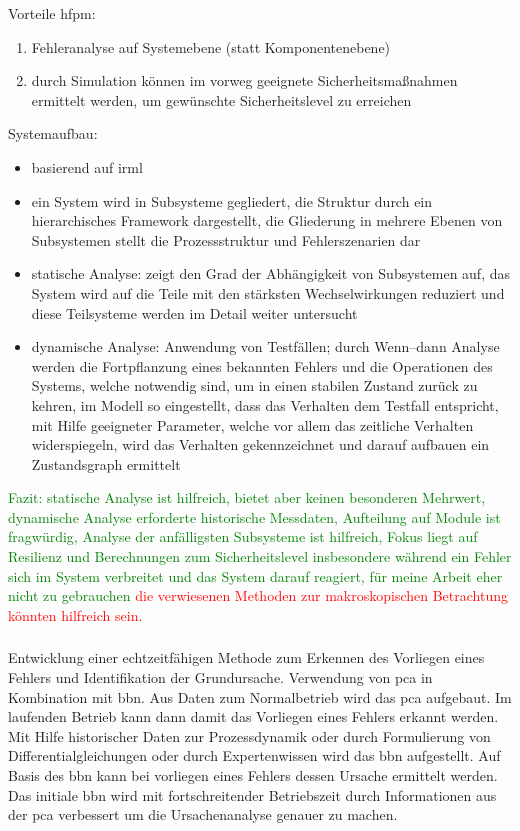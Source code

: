 Vorteile \ac{hfpm}: \begin{enumerate}
\item Fehleranalyse auf Systemebene (statt Komponentenebene)
\item durch Simulation k\"onnen im vorweg geeignete Sicherheitsma\ss{}nahmen ermittelt werden, um gew\"unschte Sicherheitslevel zu erreichen
\end{enumerate}
Systemaufbau: \begin{itemize}
\item basierend auf \ac{irml}
\item ein System wird in Subsysteme gegliedert, die Struktur durch ein hierarchisches Framework dargestellt, die Gliederung in mehrere Ebenen von Subsystemen stellt die Prozessstruktur und Fehlerszenarien dar
\item statische Analyse: zeigt den Grad der Abh\"angigkeit von Subsystemen auf, das System wird auf die Teile mit den st\"arksten Wechselwirkungen reduziert und diese Teilsysteme werden im Detail weiter untersucht
\item dynamische Analyse: Anwendung von Testf\"allen; durch Wenn--dann Analyse werden die Fortpflanzung eines bekannten Fehlers und die Operationen des Systems, welche notwendig sind, um in einen stabilen Zustand zur\"uck zu kehren, im Modell so eingestellt, dass das Verhalten dem Testfall entspricht, mit Hilfe geeigneter Parameter, welche vor allem das zeitliche Verhalten widerspiegeln, wird das Verhalten gekennzeichnet und darauf aufbauen ein Zustandsgraph ermittelt
\end{itemize}

\textcolor{green}{Fazit: statische Analyse ist hilfreich, bietet aber keinen besonderen Mehrwert, dynamische Analyse erforderte historische Messdaten, Aufteilung auf Module ist fragw\"urdig, Analyse der anf\"alligsten Subsysteme ist hilfreich, Fokus liegt auf Resilienz und Berechnungen zum Sicherheitslevel insbesondere w\"ahrend ein Fehler sich im System verbreitet und das System darauf reagiert, f\"ur meine Arbeit eher nicht zu gebrauchen}
\textcolor{red}{die verwiesenen Methoden zur makroskopischen Betrachtung k\"onnten hilfreich sein.}

\subsubsection{\cite{Mallick_2013}} Entwicklung einer echtzeitf\"ahigen Methode zum Erkennen des Vorliegen eines Fehlers und Identifikation der Grundursache. Verwendung von \ac{pca} in Kombination mit \ac{bbn}. Aus Daten zum Normalbetrieb wird das \ac{pca} aufgebaut. Im laufenden Betrieb kann dann damit das Vorliegen eines Fehlers erkannt werden. Mit Hilfe historischer Daten zur Prozessdynamik oder durch Formulierung von Differentialgleichungen oder durch Expertenwissen wird das \ac{bbn} aufgestellt. Auf Basis des \ac{bbn} kann bei vorliegen eines Fehlers dessen Ursache ermittelt werden. Das initiale \ac{bbn} wird mit fortschreitender Betriebszeit durch Informationen aus der \ac{pca} verbessert um die Ursachenanalyse genauer zu machen.  

